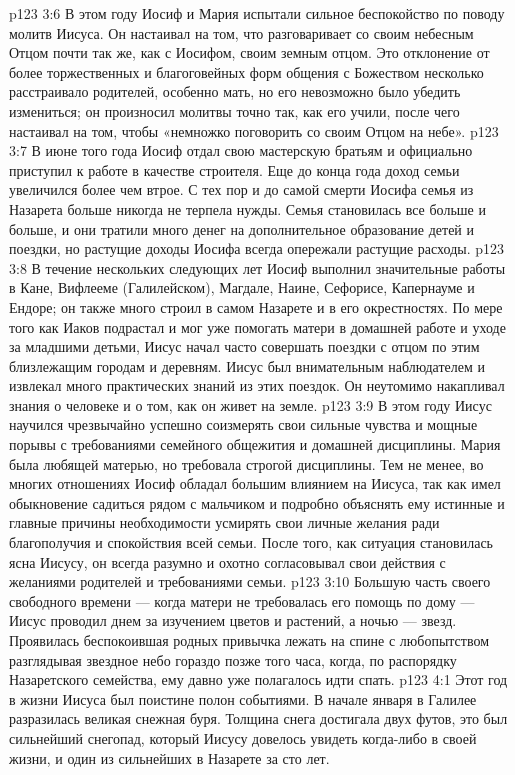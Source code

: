 \vs p123 3:6 \pc В этом году Иосиф и Мария испытали сильное беспокойство по поводу молитв Иисуса. Он настаивал на том, что разговаривает со своим небесным Отцом почти так же, как с Иосифом, своим земным отцом. Это отклонение от более торжественных и благоговейных форм общения с Божеством несколько расстраивало родителей, особенно мать, но его невозможно было убедить измениться; он произносил молитвы точно так, как его учили, после чего настаивал на том, чтобы «немножко поговорить со своим Отцом на небе».
\vs p123 3:7 В июне того года Иосиф отдал свою мастерскую братьям и официально приступил к работе в качестве строителя. Еще до конца года доход семьи увеличился более чем втрое. С тех пор и до самой смерти Иосифа семья из Назарета больше никогда не терпела нужды. Семья становилась все больше и больше, и они тратили много денег на дополнительное образование детей и поездки, но растущие доходы Иосифа всегда опережали растущие расходы.
\vs p123 3:8 В течение нескольких следующих лет Иосиф выполнил значительные работы в Кане, Вифлееме (Галилейском), Магдале, Наине, Сефорисе, Капернауме и Ендоре; он также много строил в самом Назарете и в его окрестностях. По мере того как Иаков подрастал и мог уже помогать матери в домашней работе и уходе за младшими детьми, Иисус начал часто совершать поездки с отцом по этим близлежащим городам и деревням. Иисус был внимательным наблюдателем и извлекал много практических знаний из этих поездок. Он неутомимо накапливал знания о человеке и о том, как он живет на земле.
\vs p123 3:9 \pc В этом году Иисус научился чрезвычайно успешно соизмерять свои сильные чувства и мощные порывы с требованиями семейного общежития и домашней дисциплины. Мария была любящей матерью, но требовала строгой дисциплины. Тем не менее, во многих отношениях Иосиф обладал большим влиянием на Иисуса, так как имел обыкновение садиться рядом с мальчиком и подробно объяснять ему истинные и главные причины необходимости усмирять свои личные желания ради благополучия и спокойствия всей семьи. После того, как ситуация становилась ясна Иисусу, он всегда разумно и охотно согласовывал свои действия с желаниями родителей и требованиями семьи.
\vs p123 3:10 \pc Большую часть своего свободного времени --- когда матери не требовалась его помощь по дому --- Иисус проводил днем за изучением цветов и растений, а ночью --- звезд. Проявилась беспокоившая родных привычка лежать на спине с любопытством разглядывая звездное небо гораздо позже того часа, когда, по распорядку Назаретского семейства, ему давно уже полагалось идти спать.
\vs p123 4:1 Этот год в жизни Иисуса был поистине полон событиями. В начале января в Галилее разразилась великая снежная буря. Толщина снега достигала двух футов, это был сильнейший снегопад, который Иисусу довелось увидеть когда\hyp{}либо в своей жизни, и один из сильнейших в Назарете за сто лет.
